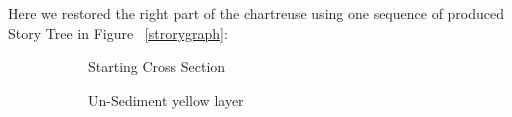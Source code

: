 \documentclass[12pt, a4paper]{report} %
\begin{document}
Here we restored the right part of the chartreuse using one sequence of produced Story Tree in Figure ~\ref{strorygraph}:
\begin{center}
\begin{figure}[H]
\centering
	\begin{subfigure}[b]{.45\linewidth}
	\centering
	\caption{Starting Cross Section}
	\end{subfigure}
	\begin{subfigure}[b]{.45\linewidth}
	\centering
	\caption{Un-Sediment yellow layer}
	\end{subfigure}
	\begin{subfigure}[b]{.45\linewidth}
	\centering

\end{subfigure}
\end{figure}
\end{center}
\end{document}
